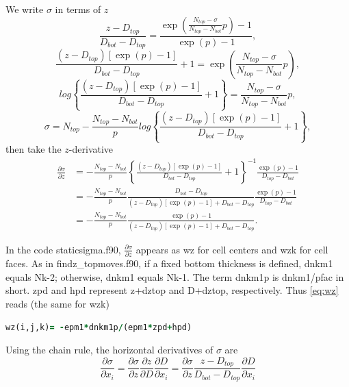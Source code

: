 \documentclass[12pt,letterpaper,titlepage]{article}
\newcommand{\Blue}[1]{{\color{blue}#1}}
\begin{document}
We write $\sigma$ in terms of $z$
\begin{equation}
  \frac{z-D_{top}}{D_{bot}-D_{top}}= \frac{\exp\left(\frac{N_{top}-\sigma}{N_{top}-N_{bot}} p\right) - 1}{\exp(p)-1}, \nonumber 
\end{equation}
\begin{equation}
  \frac{(z-D_{top})[\exp(p)-1]}{D_{bot}-D_{top}} +1 = \exp\left(\frac{N_{top}-\sigma}{N_{top}-N_{bot}}p \right), \nonumber 
\end{equation}
\begin{equation}
  log{\left\{\frac{(z-D_{top})[\exp(p)-1]}{D_{bot}-D_{top}} +1 \right\}} = \frac{N_{top}-\sigma}{N_{top}-N_{bot}}p, \nonumber 
\end{equation}
\begin{equation}
  \sigma = N_{top} - \frac{N_{top}-N_{bot}}{p} log{\left\{\frac{(z-D_{top})[\exp(p)-1]}{D_{bot}-D_{top}} +1 \right\}}, \nonumber 
\end{equation}
then take the $z$-derivative
\begin{align}
  \frac{\partial \sigma}{\partial z} &=-\frac{N_{top}-N_{bot}}{p} \left\{\frac{(z-D_{top})[\exp(p)-1]}{D_{bot}-D_{top}} +1 \right\}^{-1} \frac{\exp(p)-1}{D_{top}-D_{bot}} \nonumber \\
  & =-\frac{N_{top}-N_{bot}}{p} \frac{D_{bot}-D_{top}}{(z-D_{top})[\exp(p)-1]+D_{bot}-D_{top}} \frac{\exp(p)-1}{D_{top}-D_{bot}} \nonumber \\
  &=-\frac{N_{top}-N_{bot}}{p} \frac{\exp(p)-1}{(z-D_{top})[\exp(p)-1]+D_{bot}-D_{top}}. \label{eq:wz}
\end{align}

In the code staticsigma.f90, $\frac{\partial \sigma}{\partial z}$ appears as \Blue{wz} for cell centers and \Blue{wzk} for cell faces. As in findz\_topmoves.f90, if a fixed bottom thickness is defined, dnkm1 equals Nk-2; otherwise, dnkm1 equals Nk-1. The term \Blue{dnkm1p} is dnkm1/pfac in short. \Blue{zpd} and \Blue{hpd} represent z+dztop and D+dztop, respectively. Thus \eqref{eq:wz} reads (the same for wzk)
\begin{lstlisting}[language=Fortran, caption=staticsigma.f90]
    wz(i,j,k)= -epm1*dnkm1p/(epm1*zpd+hpd)
\end{lstlisting}

Using the chain rule, the horizontal derivatives of $\sigma$ are
\begin{equation}
 \frac{\partial \sigma}{\partial x_i} = \frac{\partial \sigma}{\partial z} \frac{\partial z}{\partial D} \frac{\partial D}{\partial x_i} = \frac{\partial \sigma}{\partial z}\frac{z-D_{top}}{D_{bot}-D_{top}}\frac{\partial D}{\partial x_i} \label{eq:wx}
\end{equation}
\end{document}
